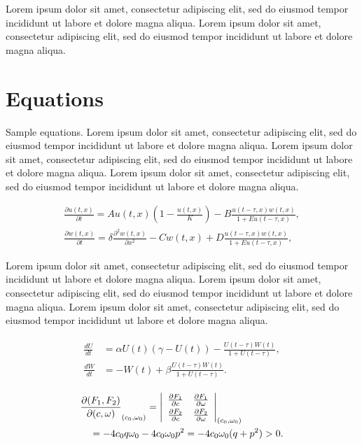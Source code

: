 \documentclass[
  journal=largetwo,
  manuscript=article-type,
  year=2020,
  volume=37,
]{cup-journal}
\begin{document}
Lorem ipsum dolor sit amet, consectetur adipiscing elit, sed do eiusmod tempor incididunt ut labore et dolore magna aliqua. Lorem ipsum dolor sit amet, consectetur adipiscing elit, sed do eiusmod tempor incididunt ut labore et dolore magna aliqua. 

\section{Equations}

Sample equations. Lorem ipsum dolor sit amet, consectetur adipiscing elit, sed do eiusmod tempor incididunt ut labore et dolore magna aliqua. Lorem ipsum dolor sit amet, consectetur adipiscing elit, sed do eiusmod tempor incididunt ut labore et dolore magna aliqua. Lorem ipsum dolor sit amet, consectetur adipiscing elit, sed do eiusmod tempor incididunt ut labore et dolore magna aliqua. 


\begin{equation}
\begin{aligned}\label{eq:first}
\frac{\partial u(t,x)}{\partial t} = Au(t,x) \left(1-\frac{u(t,x)}{K}\right)
 -B\frac{u(t-\tau,x) w(t,x)}{1+Eu(t-\tau,x)},\\
\frac{\partial w(t,x)}{\partial t} =\delta \frac{\partial^2w(t,x)}{\partial x^2}-Cw(t,x)
+D\frac{u(t-\tau,x)w(t,x)}{1+Eu(t-\tau,x)},
\end{aligned}
\end{equation}

 Lorem ipsum dolor sit amet, consectetur adipiscing elit, sed do eiusmod tempor incididunt ut labore et dolore magna aliqua. Lorem ipsum dolor sit amet, consectetur adipiscing elit, sed do eiusmod tempor incididunt ut labore et dolore magna aliqua. Lorem ipsum dolor sit amet, consectetur adipiscing elit, sed do eiusmod tempor incididunt ut labore et dolore magna aliqua. 

\begin{align}\label{eq:another}
\begin{split}
\frac{dU}{dt} &=\alpha U(t)(\gamma -U(t))-\frac{U(t-\tau)W(t)}{1+U(t-\tau)},\\
\frac{dW}{dt} &=-W(t)+\beta\frac{U(t-\tau)W(t)}{1+U(t-\tau)}.
\end{split}
\end{align}


\begin{align*}
&\frac{\partial(F_1,F_2)}{\partial(c,\omega)}_{(c_0,\omega_0)} = \left|
\begin{array}{ll}
\frac{\partial F_1}{\partial c} &\frac{\partial F_1}{\partial \omega} \\\noalign{\vskip3pt}
\frac{\partial F_2}{\partial c}&\frac{\partial F_2}{\partial \omega}
\end{array}\right|_{(c_0,\omega_0)}\\
&\quad=-4c_0q\omega_0 -4c_0\omega_0p^2 =-4c_0\omega_0(q+p^2)>0.
\end{align*}
\end{document}
